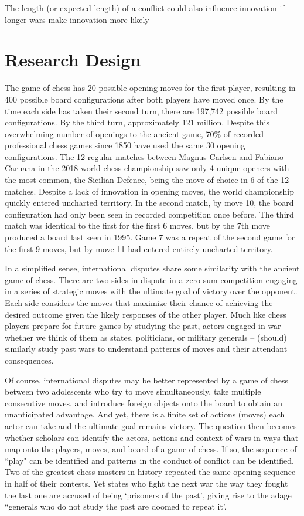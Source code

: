 \documentclass[12pt,letterpaper]{article}
\begin{document}
	The length (or expected length) of a conflict could also influence innovation if longer wars make innovation more likely \citep[38-39]{rosen_winningnextwar_1991}

\section{Research Design}
	The game of chess has 20 possible opening moves for the first player, resulting in 400 possible board configurations after both players have moved once. By the time each side has taken their second turn, there are 197,742 possible board configurations. By the third turn, approximately 121 million. Despite this overwhelming number of openings to the ancient game, 70\% of recorded professional chess games since 1850 have used the same 30 opening configurations. The 12 regular matches between Magnus Carlsen and Fabiano Caruana in the 2018 world chess championship saw only 4 unique openers with the most common, the Sicilian Defence, being the move of choice in 6 of the 12 matches. Despite a lack of innovation in opening moves, the world championship quickly entered uncharted territory. In the second match, by move 10, the board configuration had only been seen in recorded competition once before. The third match was identical to the first for the first 6 moves, but by the 7th move produced a board last seen in 1995. Game 7 was a repeat of the second game for the first 9 moves, but by move 11 had entered entirely uncharted territory.
	
	In a simplified sense, international disputes share some similarity with the ancient game of chess. There are two sides in dispute in a zero-sum competition engaging in a series of strategic moves with the ultimate goal of victory over the opponent. Each side considers the moves that maximize their chance of achieving the desired outcome given the likely responses of the other player. Much like chess players prepare for future games by studying the past, actors engaged in war -- whether we think of them as states, politicians, or military generals -- (should) similarly study past wars to understand patterns of moves and their attendant consequences.
	
	Of course, international disputes may be better represented by a game of chess between two adolescents who try to move simultaneously, take multiple consecutive moves, and introduce foreign objects onto the board to obtain an unanticipated advantage. And yet, there is a finite set of actions (moves) each actor can take and the ultimate goal remains victory. The question then becomes whether scholars can identify the actors, actions and context of wars in ways that map onto the players, moves, and board of a game of chess. If so, the sequence of ``play" can be identified and patterns in the conduct of conflict can be identified. Two of the greatest chess masters in history repeated the same opening sequence in half of their contests. Yet states who fight the next war the way they fought the last one are accused of being `prisoners of the past', giving rise to the adage ``generals who do not study the past are doomed to repeat it'.
\end{document}
